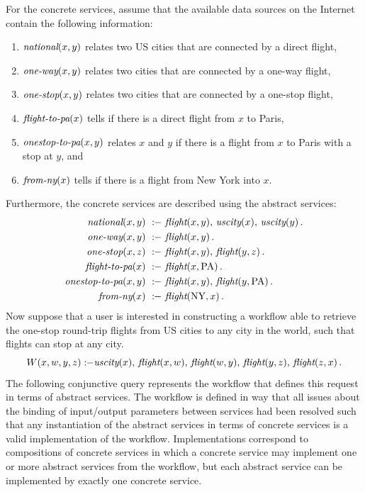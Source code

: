 \documentclass{llncs}
\newcommand{\qrule}{:\!\!-}
\newcommand{\flight}{\text{\it flight}}
\newcommand{\UScity}{\text{\it uscity}}
\newcommand{\national}{\text{\it national}}
\newcommand{\oneway}{\text{\it one-way}}
\newcommand{\onestop}{\text{\it one-stop}}
\newcommand{\flightPA}{\text{\it flight-to-pa}}
\newcommand{\onestopPA}{\text{\it onestop-to-pa}}
\newcommand{\fromNY}{\text{\it from-ny}}
\newcommand{\PA}{\text{PA}}
\newcommand{\NY}{\text{NY}}
\begin{document}
For the concrete services, assume that the available data sources on
the Internet contain the following information:
\begin{enumerate}[--]
\item $\national(x,y)$ relates two US cities that are connected by a direct flight,
\item $\oneway(x,y)$ relates two cities that are connected by a one-way flight,
\item $\onestop(x,y)$ relates two cities that are connected by a one-stop flight,
\item $\flightPA(x)$ tells if there is a direct flight from $x$ to Paris,
\item $\onestopPA(x,y)$ relates $x$ and $y$ if there is a flight from $x$ to Paris
      with a stop at $y$, and
\item $\fromNY(x)$ tells if there is a flight from New York into $x$.
\end{enumerate}
Furthermore, the concrete services are described using the abstract services:
\begin{alignat*}{1}
\national(x,y)\   &\qrule\ \flight(x,y),\,\UScity(x),\,\UScity(y)\,. \\
\oneway(x,y)\     &\qrule\ \flight(x,y)\,. \\
\onestop(x,z)\    &\qrule\ \flight(x,y),\,\flight(y,z)\,. \\
\flightPA(x)\     &\qrule\ \flight(x,\PA)\,. \\
\onestopPA(x,y)\  &\qrule\ \flight(x,y),\,\flight(y,\PA)\,. \\
\fromNY(x)\       &\qrule\ \flight(\NY,x)\,.
\end{alignat*}
Now suppose that a user is interested in constructing a workflow able to retrieve
the one-stop round-trip flights from US cities to any city in the world, such that
flights can stop at any city. 
\[ W(x,w,y,z) \qrule \UScity(x),\,\flight(x,w),\,\flight(w,y),\,\flight(y,z),\,\flight(z,x)\,. \]
The following conjunctive query represents the workflow that defines this request
in terms of abstract services. The workflow is defined in way that all issues
about the binding of input/output parameters between services had been resolved
such that any instantiation of the abstract services in terms of concrete services
is a valid implementation of the workflow. 
Implementations correspond to compositions of concrete services in which a concrete
service may implement one or more abstract services from the workflow, but each
abstract service can be implemented by exactly one concrete service.
\end{document}
